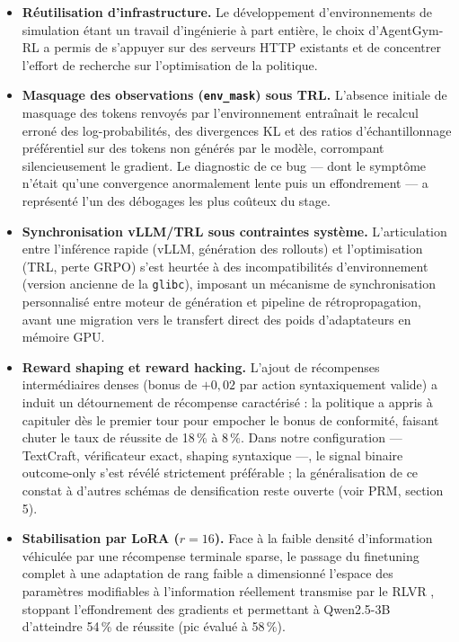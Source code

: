 \documentclass[11pt,a4paper]{article}
\begin{document}
\begin{itemize}
    \item \textbf{Réutilisation d'infrastructure.} Le développement d'environnements de simulation étant un travail d'ingénierie à part entière, le choix d'AgentGym-RL a permis de s'appuyer sur des serveurs HTTP existants et de concentrer l'effort de recherche sur l'optimisation de la politique.
    \item \textbf{Masquage des observations (\texttt{env\_mask}) sous TRL.} L'absence initiale de masquage des tokens renvoyés par l'environnement entraînait le recalcul erroné des log-probabilités, des divergences KL et des ratios d'échantillonnage préférentiel sur des tokens non générés par le modèle, corrompant silencieusement le gradient. Le diagnostic de ce bug — dont le symptôme n'était qu'une convergence anormalement lente puis un effondrement — a représenté l'un des débogages les plus coûteux du stage.
    \item \textbf{Synchronisation vLLM/TRL sous contraintes système.} L'articulation entre l'inférence rapide (vLLM, génération des rollouts) et l'optimisation (TRL, perte GRPO) s'est heurtée à des incompatibilités d'environnement (version ancienne de la \texttt{glibc}), imposant un mécanisme de synchronisation personnalisé entre moteur de génération et pipeline de rétropropagation, avant une migration vers le transfert direct des poids d'adaptateurs en mémoire GPU.
    \item \textbf{Reward shaping et reward hacking.} L'ajout de récompenses intermédiaires denses (bonus de $+0{,}02$ par action syntaxiquement valide) a induit un détournement de récompense caractérisé \cite{skalse2022defining} : la politique a appris à capituler dès le premier tour pour empocher le bonus de conformité, faisant chuter le taux de réussite de 18\,\% à 8\,\%. Dans notre configuration — TextCraft, vérificateur exact, shaping syntaxique —, le signal binaire outcome-only s'est révélé strictement préférable ; la généralisation de ce constat à d'autres schémas de densification reste ouverte (voir PRM, section 5).
    \item \textbf{Stabilisation par LoRA ($r=16$).} Face à la faible densité d'information véhiculée par une récompense terminale sparse, le passage du finetuning complet à une adaptation de rang faible a dimensionné l'espace des paramètres modifiables à l'information réellement transmise par le RLVR \cite{schulman2025lora}, stoppant l'effondrement des gradients et permettant à Qwen2.5-3B d'atteindre 54\,\% de réussite (pic évalué à 58\,\%).
\end{itemize}
\end{document}
